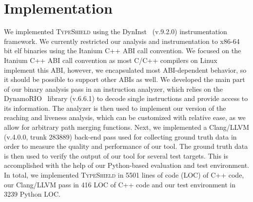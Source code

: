 \section{Implementation}
\label{chapter:Implementation}

We implemented \textsc{TypeShield} using the DynInst~\cite{bernat:dyninst} (v.9.2.0) instrumentation framework. We currently restricted our analysis and instrumentation to x86-64 
bit elf binaries using the Itanium C++ ABI call convention.
We focused on the Itanium C++ ABI call 
convention as most C/C++ compilers on Linux implement this ABI, however, we encapsulated most ABI-dependent behavior, so it should be 
possible to support other ABIs as well. 
We developed the main part of our binary analysis pass in an instruction analyzer, which relies on the DynamoRIO~\cite{dynamorio:drmemory} library (v.6.6.1)
to decode single instructions and provide access to
its information. 
The analyzer is then used to implement our version of the reaching and liveness analysis, 
which can be customized with relative ease, as we allow for arbitrary path merging functions. 
Next, we implemented a 
Clang/LLVM (v.4.0.0, trunk 283889) back-end pass used for collecting ground truth data in order to measure the quality and performance of our tool. 
The ground truth data is then used to verify 
the output of our tool for several test targets. This is accomplished with the help of our Python-based evaluation and test environment. 
In total, we implemented \textsc{TypeShield} in 5501 lines of code (LOC) of C++ code, our Clang/LLVM pass in 416 LOC
of C++ code and our test environment in 3239 Python LOC. 


